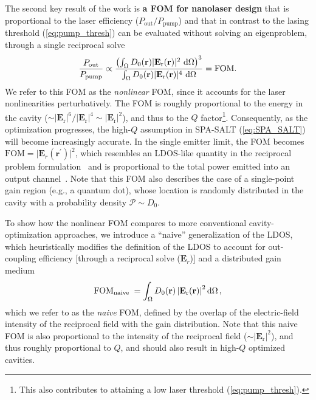 The second key result of the work is \textbf{a FOM for nanolaser design} that is proportional to the laser efficiency ($P_\text{out}/P_\text{pump}$) and that in contrast to the lasing threshold (\eqref{eq:pump_thresh}) can be evaluated without solving an eigenproblem, through a single reciprocal solve~\cite{ownpub4}
\begin{equation}\label{eq:eff_nl}
    \frac{P_\text{out}}{P_\text{pump}} \propto \frac{\left( \int_{\Omega} D_0(\mathbf{r})|\mathbf{E}_{\text{r}}(\mathbf{r})|^2 \,  \mathop{}\!\text{d} \Omega \right)^3} {\int_{\Omega} D_0(\mathbf{r}) |\mathbf{E}_{\text{r}}(\mathbf{r})|^4 \,  \mathop{}\!\text{d} \Omega} = \text{FOM}.
\end{equation}
We refer to this FOM as the \emph{nonlinear} FOM, since it accounts for the laser nonlinearities perturbatively. The FOM is roughly proportional 
to the energy in the cavity ($\sim |\mathbf{E}_{\text{r}}|^6 / |\mathbf{E}_{\text{r}}|^4 \sim |\mathbf{E}_{\text{r}}|^2$), and thus to the $Q$ factor\footnote{This also contributes to attaining a low
laser threshold (\eqref{eq:pump_thresh}).}. Consequently, as the optimization progresses, the high-$Q$ assumption in SPA-SALT (\eqref{eq:SPA_SALT}) will become increasingly accurate. In the single emitter limit, the FOM becomes
$\text{FOM}=\vert \mathbf{E}_{r}(\mathbf{r}^\prime) \vert^2$, which resembles an LDOS-like quantity in the reciprocal problem formulation~\cite{reci} and is proportional to the total power emitted into an output channel~\cite[App.~C]{reci}. 
 Note that this FOM also describes the case of a single-point gain region (e.g., a quantum dot),
whose location is randomly distributed in the cavity with a probability density $\mathcal{P} \sim D_0$. 

To show how the nonlinear FOM compares to more conventional cavity-optimization approaches, we introduce a “naive” generalization of the LDOS, which heuristically modifies the definition
of the LDOS to account for out-coupling efficiency [through a reciprocal solve ($\mathbf{E}_r$)] and a distributed gain
medium
\begin{equation}\label{eq:SEL}
 \text{FOM}_{\text {naive }}=\int_{\Omega} D_0(\mathbf{r})\left|\mathbf{E}_{\text{r}}(\mathbf{r})\right|^2 \mathop{}\!\text{d} \Omega\,,
\end{equation}
which we refer to as the \emph{naive} FOM, defined by the overlap of the electric-field intensity of the reciprocal field with the gain distribution.
Note that this naive FOM is also proportional to the intensity of the reciprocal field ($\sim |\mathbf{E}_{\text{r}}|^2$), and thus roughly proportional to $Q$, and should also result in 
high-$Q$ optimized cavities.

